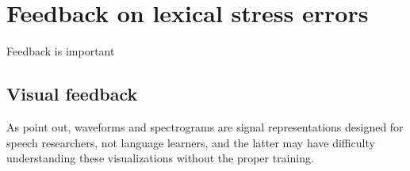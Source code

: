 %
%
\chapter{Feedback on lexical stress errors}
\label{chap:feedback}


 	\citep{Hattie2007}

Feedback is important \citep{Neri2002}


%


\section{Visual feedback}
\label{sec:fb:visual}

\citep{Sitaram2011}

%	
%	
	
	As \textcite{Neri2002} point out, waveforms and spectrograms are signal representations designed for speech researchers, not language learners, and the latter may have difficulty understanding these visualizations without the proper training.
	
